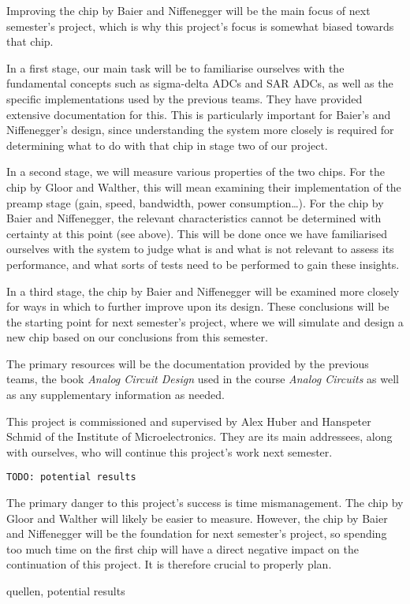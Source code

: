 \documentclass[a4paper,10pt]{article}
\begin{document}
Improving the  chip by Baier  and Niffenegger will be  the main focus  of next
semester's  project, which  is why  this  project's focus  is somewhat  biased
towards that chip.

In a  first stage,  our main task  will be to  familiarise ourselves  with the
fundamental concepts such as sigma-delta ADCs and SAR ADCs, as well as the
specific  implementations  used  by  the previous  teams. They  have  provided
extensive documentation  for this. This is particularly  important for Baier's
and  Niffenegger's design,  since  understanding the  system  more closely  is
required  for determining  what to  do  with that  chip  in stage  two of  our
project.

In a  second stage, we will  measure various properties of  the two chips. For
the chip by  Gloor and Walther, this will mean  examining their implementation
of the preamp stage (gain, speed, bandwidth, power consumption\ldots). For the
chip  by  Baier  and  Niffenegger,  the  relevant  characteristics  cannot  be
determined with certainty at this point (see above). This will be done once we
have familiarised ourselves with  the system to judge what is  and what is not
relevant  to assess  its  performance, and  what  sorts of  tests  need to  be
performed to gain these insights.

In  a  third  stage, the  chip  by  Baier  and  Niffenegger will  be  examined
more  closely for  ways in  which to  further improve  upon its  design. These
conclusions will be  the starting point for next semester's  project, where we
will  simulate and  design  a new  chip  based on  our  conclusions from  this
semester.

The  primary resources  will be  the  documentation provided  by the  previous
teams, the book  \emph{Analog Circuit Design} used in  the course \emph{Analog
Circuits} as well as any supplementary information as needed.

This project is commissioned and supervised by Alex Huber and Hanspeter Schmid
of the Institute of Microelectronics. They are its main addressees, along with
ourselves, who will continue this project's work next semester.

\texttt{TODO: potential results}

The primary danger  to this project's success is time mismanagement. The chip by
Gloor and Walther will likely be easier to measure. However, the chip  by  Baier
and Niffenegger will be the foundation for next  semester's project, so spending
too  much  time  on  the  first  chip will have a direct negative impact on  the
continuation  of  this project.  It  is  therefore  crucial  to  properly  plan.


quellen, potential results
\end{document}
